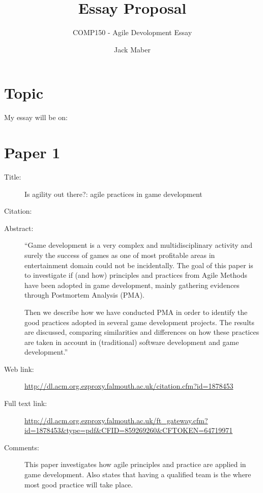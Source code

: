 \documentclass{scrartcl}
\title{Essay Proposal}
\subtitle{COMP150 - Agile Devolopment Essay}
\author{Jack Maber}
\begin{document}
\maketitle

\section*{Topic}

My essay will be on:


\section*{Paper 1}
\begin{description}
\item[Title:] Is agility out there?: agile practices in game development
\item[Citation:] \cite{shannon}
\item[Abstract:] ``Game development is a very complex and multidisciplinary activity and surely the success of games as one of most profitable areas in entertainment domain could not be incidentally. The goal of this paper is to investigate if (and how) principles and practices from Agile Methods have been adopted in game development, mainly gathering evidences through Postmortem Analysis (PMA).

Then we describe how we have conducted PMA in order to identify the good practices adopted in several game development projects. The results are discussed, comparing similarities and differences on how these practices are taken in account in (traditional) software development and game development.''
\item[Web link:] \url{http://dl.acm.org.ezproxy.falmouth.ac.uk/citation.cfm?id=1878453}
\item[Full text link:] \url{http://dl.acm.org.ezproxy.falmouth.ac.uk/ft_gateway.cfm?id=1878453&type=pdf&CFID=859269260&CFTOKEN=64719971}
\item[Comments:] This paper investigates how agile principles and practice are applied in game development. Also states that having a qualified team is the where most good practice will take place.
\end{description}
\end{document}
